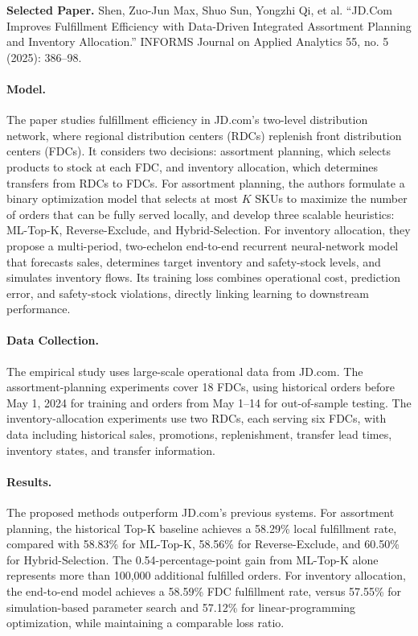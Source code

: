 \documentclass[12pt,a4paper]{article}
\begin{document}
\begin{problem}
\textbf{Selected Paper.} Shen, Zuo-Jun Max, Shuo Sun, Yongzhi Qi, et al. ``JD.Com Improves Fulfillment Efficiency with Data-Driven Integrated Assortment Planning and Inventory Allocation.'' INFORMS Journal on Applied Analytics 55, no. 5 (2025): 386–98.


\paragraph{Model.}
The paper studies fulfillment efficiency in JD.com's two-level distribution network, where regional distribution centers (RDCs) replenish front distribution centers (FDCs). It considers two decisions: assortment planning, which selects products to stock at each FDC, and inventory allocation, which determines transfers from RDCs to FDCs. For assortment planning, the authors formulate a binary optimization model that selects at most \(K\) SKUs to maximize the number of orders that can be fully served locally, and develop three scalable heuristics: ML-Top-K, Reverse-Exclude, and Hybrid-Selection. For inventory allocation, they propose a multi-period, two-echelon end-to-end recurrent neural-network model that forecasts sales, determines target inventory and safety-stock levels, and simulates inventory flows. Its training loss combines operational cost, prediction error, and safety-stock violations, directly linking learning to downstream performance.

\paragraph{Data Collection.}
The empirical study uses large-scale operational data from JD.com. The assortment-planning experiments cover 18 FDCs, using historical orders before May 1, 2024 for training and orders from May 1--14 for out-of-sample testing. The inventory-allocation experiments use two RDCs, each serving six FDCs, with data including historical sales, promotions, replenishment, transfer lead times, inventory states, and transfer information.

\paragraph{Results.}
The proposed methods outperform JD.com's previous systems. For assortment planning, the historical Top-K baseline achieves a 58.29\% local fulfillment rate, compared with 58.83\% for ML-Top-K, 58.56\% for Reverse-Exclude, and 60.50\% for Hybrid-Selection. The 0.54-percentage-point gain from ML-Top-K alone represents more than 100,000 additional fulfilled orders. For inventory allocation, the end-to-end model achieves a 58.59\% FDC fulfillment rate, versus 57.55\% for simulation-based parameter search and 57.12\% for linear-programming optimization, while maintaining a comparable loss ratio.


\end{problem}
\end{document}
